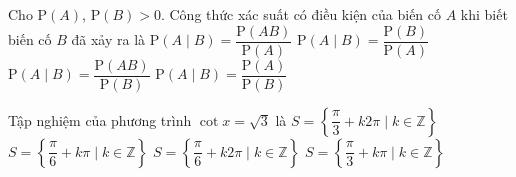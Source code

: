 \begin{ex}%
Cho $\mathrm{P}(A)$, $\mathrm{P}(B)>0$. Công thức xác suất có điều kiện của biến cố $A$ khi biết biến cố $B$ đã xảy ra là
\choice
{$\mathrm{P}\left(A\mid B\right)=\dfrac{\mathrm{P}\left(AB\right)}{\mathrm{P}(A)}$}
{$\mathrm{P}\left(A\mid B\right)=\dfrac{\mathrm{P}(B)}{\mathrm{P}(A)}$}
{\True $\mathrm{P}\left(A\mid B\right)=\dfrac{\mathrm{P}\left(AB\right)}{\mathrm{P}(B)}$}
{$\mathrm{P}\left(A\mid B\right)=\dfrac{\mathrm{P}(A)}{\mathrm{P}(B)}$}
\end{ex}

\begin{ex}%
Tập nghiệm của phương trình $\cot x=\sqrt{3}$ là 
\choice
{$S=\left\{\dfrac{\pi}{3}+k2\pi\mid k\in\mathbb{Z}\right\}$}
{\True $S=\left\{\dfrac{\pi}{6}+k\pi\mid k\in\mathbb{Z}\right\}$}
{$S=\left\{\dfrac{\pi}{6}+k2\pi\mid k\in\mathbb{Z}\right\}$}
{$S=\left\{\dfrac{\pi}{3}+k\pi\mid k\in\mathbb{Z}\right\}$}
\end{ex}

